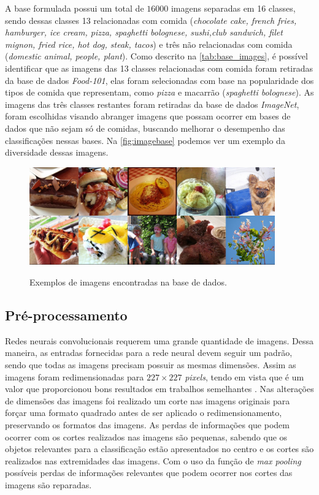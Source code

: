 \par A base formulada possui um total de $16000$ imagens separadas em 16 classes, sendo dessas classes 13 relacionadas com comida (\textit{chocolate cake, french fries, hamburger, ice cream, pizza, spaghetti bolognese, sushi,club sandwich, filet mignon, fried rice, hot dog, steak, tacos}) e três não relacionadas com comida (\textit{domestic animal, people, plant}). Como descrito na \autoref{tab:base_images}, é possível identificar que as imagens das 13 classes relacionadas com comida foram retiradas da base de dados \textit{Food-101}, elas foram selecionadas com base na popularidade dos tipos de comida que representam, como \textit{pizza} e macarrão (\textit{spaghetti bolognese}). As imagens das três classes restantes foram retiradas da base de dados \textit{ImageNet}, foram escolhidas visando abranger imagens que possam ocorrer em bases de dados que não sejam só de comidas, buscando melhorar o desempenho das classificações nessas bases. Na \autoref{fig:imagebase} podemos ver um exemplo da diversidade dessas imagens.
\begin{figure}[H]
  \centering
  \caption{Exemplos de imagens encontradas na base de dados.}
  \includegraphics[width=300pt]{dados/figuras/imagembase}
  \label{fig:imagebase}
\end{figure}

\subsection{Pré-processamento}
\par Redes neurais convolucionais requerem uma grande quantidade de imagens. Dessa maneira, as entradas fornecidas para a rede neural devem seguir um padrão, sendo que todas as imagens precisam possuir as mesmas dimensões. Assim as imagens foram redimensionadas para $227\times227$ \textit{pixels}, tendo em vista que é um valor que proporcionou bons resultados em trabalhos semelhantes \cite{imaginetArticle}. Nas alterações de dimensões das imagens foi realizado um corte nas imagens originais para forçar uma formato quadrado antes de ser aplicado o redimensionamento, preservando os formatos das imagens. As perdas de informações que podem ocorrer com os cortes realizados nas imagens são pequenas, sabendo que os objetos relevantes para a classificação estão apresentados no centro e os cortes são realizados nas extremidades das imagens. Com o uso da função de \textit{max pooling} possíveis perdas de informações relevantes que podem ocorrer nos cortes das imagens são reparadas.  

